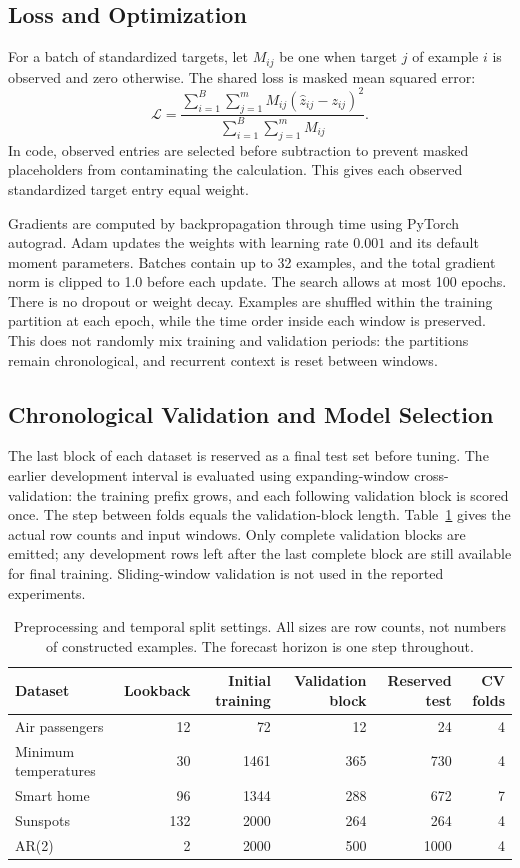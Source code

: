 \subsection{Loss and Optimization}
For a batch of standardized targets, let $M_{ij}$ be one when target $j$ of
example $i$ is observed and zero otherwise. The shared loss is masked mean
squared error:
\begin{equation}
 \mathcal{L}=\frac{\sum_{i=1}^{B}\sum_{j=1}^{m}
 M_{ij}(\hat z_{ij}-z_{ij})^2}{\sum_{i=1}^{B}\sum_{j=1}^{m}M_{ij}}.
\end{equation}
In code, observed entries are selected before subtraction to prevent masked
placeholders from contaminating the calculation. This gives each observed
standardized target entry equal weight.

Gradients are computed by backpropagation through time using PyTorch autograd.
Adam updates the weights with learning rate $0.001$ and its default moment
parameters. Batches contain up to 32 examples, and the total gradient norm is
clipped to 1.0 before each update. The search allows at most 100 epochs. There
is no dropout or weight decay. Examples are shuffled within the training
partition at each epoch, while the time order inside each window is preserved.
This does not randomly mix training and validation periods: the partitions remain
chronological, and recurrent context is reset between windows.

\subsection{Chronological Validation and Model Selection}
The last block of each dataset is reserved as a final test set before tuning.
The earlier development interval is evaluated using expanding-window
cross-validation: the training prefix grows, and each following validation block
is scored once. The step between folds equals the validation-block length.
Table~\ref{tab:split-settings} gives the actual row counts and input windows.
Only complete validation blocks are emitted; any development rows left after the
last complete block are still available for final training. Sliding-window
validation is not used in the reported experiments.

\begin{table}[t]
\centering
\small
\caption{Preprocessing and temporal split settings. All sizes are row counts,
not numbers of constructed examples. The forecast horizon is one step
throughout.}
\label{tab:split-settings}
\begin{tabular}{lrrrrr}
\toprule
Dataset & Lookback & Initial training & Validation block & Reserved test & CV folds \\
\midrule
Air passengers & 12 & 72 & 12 & 24 & 4 \\
Minimum temperatures & 30 & 1461 & 365 & 730 & 4 \\
Smart home & 96 & 1344 & 288 & 672 & 7 \\
Sunspots & 132 & 2000 & 264 & 264 & 4 \\
AR(2) & 2 & 2000 & 500 & 1000 & 4 \\
\bottomrule
\end{tabular}
\end{table}

